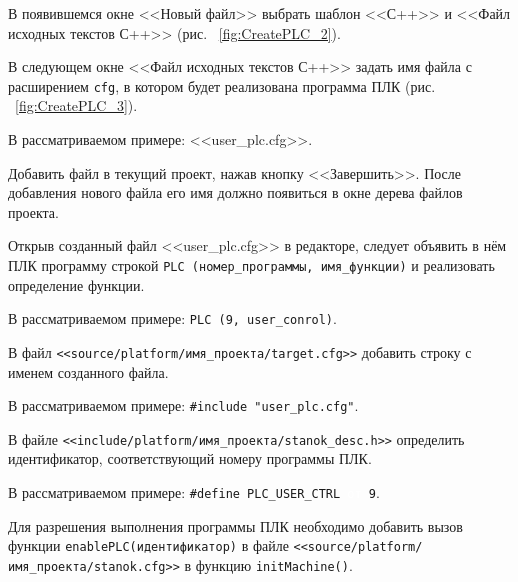 В появившемся окне <<Новый файл>> выбрать шаблон <<С++>> и <<Файл исходных текстов С++>> (рис. ~\ref{fig:CreatePLC_2}).


В следующем окне <<Файл исходных текстов С++>> задать имя файла с расширением \texttt{cfg}, в котором будет реализована программа ПЛК (рис. ~\ref{fig:CreatePLC_3}).

В рассматриваемом примере: <<user\_plc.cfg>>.


Добавить файл в текущий проект, нажав кнопку <<Завершить>>. После добавления нового файла его имя должно появиться в окне дерева файлов проекта.\killoverfullbefore


Открыв созданный файл <<user\_plc.cfg>> в редакторе, следует объявить в нём ПЛК программу строкой \texttt{PLC (номер\_программы, имя\_функции)} и реализовать определение функции.\killoverfullbefore

В рассматриваемом примере: \texttt{PLC (9, user\_conrol)}.


В файл \texttt{<<source/platform/имя\_проекта/target.cfg>>} добавить строку с именем созданного файла.\killoverfullbefore

В рассматриваемом примере: \texttt{\#include "user\_plc.cfg"}.


В файле \texttt{<<include/platform/имя\_проекта/stanok\_desc.h>>} определить идентификатор, соответствующий номеру программы ПЛК.\killoverfullbefore 

В рассматриваемом примере: \texttt{\#define PLC\_USER\_CTRL \textcolor{white}{от} 9}.


Для разрешения выполнения программы ПЛК необходимо добавить вызов функции \texttt{enablePLC(идентификатор)} в файле \texttt{<<source/platform/имя\_проекта/stanok.cfg>>} в функцию \texttt{initMachine()}.\killoverfullbefore

